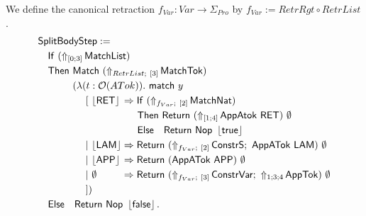 \begin{definition}[$\MS{SplitBody}$]
  \label{def:JumpTarget}
  We define the canonical retraction $f_{Var} : Var \to \Sigma_{Pro}$ by $f_{Var} := RetrRgt \circ RetrList$.
  \begin{alignat*}{1}
    & \MS{SplitBodyStep} := \\
    & \quad \MS{If}~(\LiftTapes{\MS{MatchList}}{\Vector{0;3}}) \\
    & \quad \MS{Then}~\Match~(\LiftBoth{\MS{MatchTok}}{RetrList}{\Vector{3}}) \\
    & \quad \phantom{\MS{Then}}~(\lambda (t : \Option(ATok)).~\MS{match}~y\\
    & \quad \phantom{\MS{Then}~(\lambda}~[~ \phalign{\Some{\MS{LAM}}}{\Some{\MS{RET}}} \Rightarrow \MS{If}~(\LiftBoth{\MS{MatchNat}}{f_{Var}}{\Vector{2}}) \\
    & \quad \phantom{\MS{Then}~(\lambda~[~ \Some{\MS{LAM} \Rightarrow}}~\MS{Then}~ \Return{(\LiftTapes{\MS{AppAtok~\MS{RET}}}{\Vector{1;4}})}{\None} \\
    & \quad \phantom{\MS{Then}~(\lambda~[~ \Some{\MS{LAM} \Rightarrow}}~\MS{Else}~~~ \Return{\Nop}{\Some\true} \\
    & \quad \phantom{\MS{Then}~(\lambda}~|~ \phalign{\Some{\MS{LAM}}}{\Some{\MS{LAM}}} \Rightarrow \Return{(\LiftBoth{\MS{ConstrS}}{f_{Var}}{\Vector{2}} \Seq \MS{AppATok}~\MS{LAM})}{\None} \\
    & \quad \phantom{\MS{Then}~(\lambda}~|~ \phalign{\Some{\MS{LAM}}}{\Some{\MS{APP}}} \Rightarrow \Return{(\MS{AppATok}~\MS{APP})}{\None} \\
    & \quad \phantom{\MS{Then}~(\lambda}~|~ \phalign{\Some{\MS{LAM}}}{\None} \Rightarrow \Return{(\LiftBoth{\MS{ConstrVar}}{f_{Var}}{\Vector{3}} \Seq \LiftTapes{\MS{AppTok}}{1;3;4})}{\None} \\
    & \quad \phantom{\MS{Then}~(\lambda}~]) \\
    & \quad \MS{Else}~~~ \Return{\Nop}{\Some\false}.
  \end{alignat*}

\end{definition}
